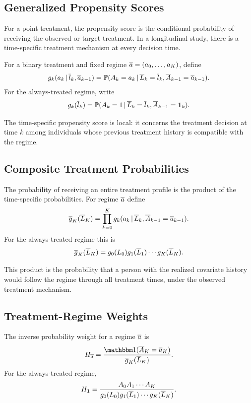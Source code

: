 \label{lec:8-4}

\subsection{Generalized Propensity Scores}

For a point treatment, the propensity score is the conditional probability of
receiving the observed or target treatment. In a longitudinal study, there is a
time-specific treatment mechanism at every decision time.

\begin{definition}
For a binary treatment and fixed regime $\overline{a}=(a_0,\ldots,a_K)$, define
\[
  g_k(a_k\,\vert\, \overline{l}_k,\overline{a}_{k-1})
  =
  \mathbb{P}(A_k=a_k\,\vert\, \overline{L}_k=\overline{l}_k,\overline{A}_{k-1}=\overline{a}_{k-1}).
\]
For the always-treated regime, write
\[
  g_k(\overline{l}_k)
  =
  \mathbb{P}(A_k=1\,\vert\, \overline{L}_k=\overline{l}_k,\overline{A}_{k-1}=\mathbf{1}_k).
\]
\end{definition}

The time-specific propensity score is local: it concerns the treatment decision
at time $k$ among individuals whose previous treatment history is compatible
with the regime.

\subsection{Composite Treatment Probabilities}

The probability of receiving an entire treatment profile is the product of the
time-specific probabilities. For regime $\overline{a}$ define
\[
  \overline{g}_K(\overline{L}_K)
  =
  \prod_{k=0}^K
  g_k(a_k\,\vert\, \overline{L}_k,\overline{A}_{k-1}=\overline{a}_{k-1}).
\]
For the always-treated regime this is
\[
  \overline{g}_K(\overline{L}_K)
  =
  g_0(L_0)g_1(\overline{L}_1)\cdots g_K(\overline{L}_K).
\]

This product is the probability that a person with the realized covariate
history would follow the regime through all treatment times, under the observed
treatment mechanism.

\subsection{Treatment-Regime Weights}

The inverse probability weight for a regime $\overline{a}$ is
\[
  H_{\abar}
  =
  \frac{\ind(\Abar_K=\abar_K)}{\gbar_K(\Lbar_K)}.
\]
For the always-treated regime,
\[
  H_{\mathbf{1}}
  =
  \frac{A_0A_1\cdots A_K}
       {g_0(L_0)g_1(\overline{L}_1)\cdots g_K(\overline{L}_K)}.
\]


